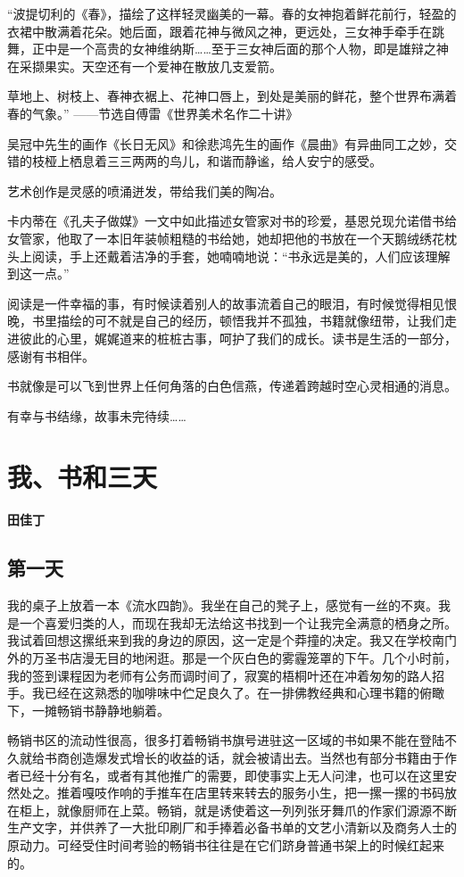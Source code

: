 \documentclass[openany,scheme = chinese, linespread = 1.5]{ctexbook}
\newcommand \name[1]{\begin{center} \kaishu \Large \bfseries #1 \end{center}}
\begin{document}
    “波提切利的《春》，描绘了这样轻灵幽美的一幕。春的女神抱着鲜花前行，轻盈的衣裙中散满着花朵。她后面，跟着花神与微风之神，更远处，三女神手牵手在跳舞，正中是一个高贵的女神维纳斯……至于三女神后面的那个人物，即是雄辩之神在采撷果实。天空还有一个爱神在散放几支爱箭。
    
草地上、树枝上、春神衣裾上、花神口唇上，到处是美丽的鲜花，整个世界布满着春的气象。”
                                    ——节选自傅雷《世界美术名作二十讲》
                                    
吴冠中先生的画作《长日无风》和徐悲鸿先生的画作《晨曲》有异曲同工之妙，交错的枝桠上栖息着三三两两的鸟儿，和谐而静谧，给人安宁的感受。

艺术创作是灵感的喷涌迸发，带给我们美的陶冶。

卡内蒂在《孔夫子做媒》一文中如此描述女管家对书的珍爱，基恩兑现允诺借书给女管家，他取了一本旧年装帧粗糙的书给她，她却把他的书放在一个天鹅绒绣花枕头上阅读，手上还戴着洁净的手套，她喃喃地说：“书永远是美的，人们应该理解到这一点。”

阅读是一件幸福的事，有时候读着别人的故事流着自己的眼泪，有时候觉得相见恨晚，书里描绘的可不就是自己的经历，顿悟我并不孤独，书籍就像纽带，让我们走进彼此的心里，娓娓道来的桩桩古事，呵护了我们的成长。读书是生活的一部分，感谢有书相伴。

书就像是可以飞到世界上任何角落的白色信燕，传递着跨越时空心灵相通的消息。

有幸与书结缘，故事未完待续……
\newpage

\section{我、书和三天}
\name{田佳丁}
\subsection*{第一天}
我的桌子上放着一本《流水四韵》。我坐在自己的凳子上，感觉有一丝的不爽。我是一个喜爱归类的人，而现在我却无法给这书找到一个让我完全满意的栖身之所。我试着回想这摞纸来到我的身边的原因，这一定是个莽撞的决定。我又在学校南门外的万圣书店漫无目的地闲逛。那是一个灰白色的雾霾笼罩的下午。几个小时前，我的签到课程因为老师有公务而调时间了，寂寞的梧桐叶还在冲着匆匆的路人招手。我已经在这熟悉的咖啡味中伫足良久了。在一排佛教经典和心理书籍的俯瞰下，一摊畅销书静静地躺着。

畅销书区的流动性很高，很多打着畅销书旗号进驻这一区域的书如果不能在登陆不久就给书商创造爆发式增长的收益的话，就会被请出去。当然也有部分书籍由于作者已经十分有名，或者有其他推广的需要，即使事实上无人问津，也可以在这里安然处之。推着嘎吱作响的手推车在店里转来转去的服务小生，把一摞一摞的书码放在柜上，就像厨师在上菜。畅销，就是诱使着这一列列张牙舞爪的作家们源源不断生产文字，并供养了一大批印刷厂和手捧着必备书单的文艺小清新以及商务人士的原动力。可经受住时间考验的畅销书往往是在它们跻身普通书架上的时候红起来的。
\end{document}
